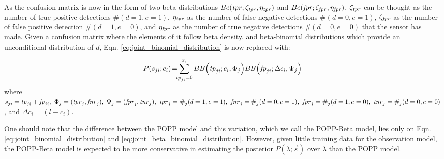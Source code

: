 As the confusion matrix is now in the form of two beta distributions $Be(\textrm{\textit{tpr}} ; \zeta_{\textrm{\textit{tpr}}}, \eta_{\textrm{\textit{tpr}}})$ and $Be(\textrm{\textit{fpr}} ; \zeta_{\textrm{\textit{fpr}}}, \eta_{\textrm{\textit{fpr}}})$, $\zeta_{\textrm{\textit{tpr}}}$ can be thought as the number of true positive detections $\#(d=1, e=1)$, $\eta_{\textrm{\textit{tpr}}}$ as the number of false negative detections $\#(d=0, e=1)$, $\zeta_{\textrm{\textit{fpr}}}$ as the number of false positive detection $\#(d=1, e=0)$, and $\eta_{\textrm{\textit{fpr}}}$ as the number of true negative detections $\#(d=0, e=0)$ that the sensor has made. Given a confusion matrix where the elements of it follow beta density, and beta-binomial distributions which provide an unconditional distribution of $d$, Eqn. \ref{eq:joint_binomial_distribution} is now replaced with:  

\begin{equation}
	\label{eq:joint_beta_binomial_distribution}
    P(s_{ji} ; c_i) \! = \! \! \! \displaystyle\sum_{\tp_{ji} = 0}^{x_{i}} \! \! ~ BB\Big(\tp_{ji} ; c_i, \Phi_j \Big) BB\Big(\fp_{ji} ; \Delta c_i, \Psi_j \Big)
\end{equation}
\noindent where $s_{ji}= \textrm{\textit{tp}}_{ji} + \textrm{\textit{fp}}_{ji},~\Phi_j = (\textrm{\textit{tpr}}_{j}, \textrm{\textit{fnr}}_{j}),~\Psi_j = (\textrm{\textit{fpr}}_j, \textrm{\textit{tnr}}_j),~\textrm{\textit{tpr}}_j = \#_j(d=1, e=1),~ \textrm{\textit{fnr}}_j = \#_j(d=0, e=1),~\textrm{\textit{fpr}}_j = \#_j(d=1, e=0),~\textrm{\textit{tnr}}_j = \#_j(d=0, e=0)$, and $\Delta c_i = (l - c_i)$.


One should note that the difference between the POPP model and this variation, which we call the POPP-Beta model, lies only on Eqn. \ref{eq:joint_binomial_distribution} and \ref{eq:joint_beta_binomial_distribution}. However, given little training data for the observation model, the POPP-Beta model is expected to be more conservative in estimating the posterior $P(\lambda ; \overrightarrow{s})$ over $\lambda$ than the POPP model. 

